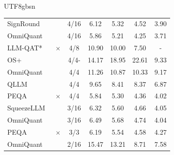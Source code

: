 \documentclass[10pt,journal,compsoc]{IEEEtran}
\newcommand{\<}{\left\langle}
\renewcommand{\>}{\right\rangle}
\newcommand{\1}{\mathbbm{1}}
\begin{document}
\begin{CJK}{UTF8}{gbsn}
\begin{table}[t]
{\begin{tabular}{l  c c |c c c c}
				SignRound~\cite{cheng2023optimize} & \checkmark & 4/16 & 6.12 & 5.32 & 4.52 & 3.90 \\ 
				OmniQuant~\cite{shao2023omniquant} & \checkmark & 4/16  & 5.86 & 5.21 & 4.25 & 3.71 \\
				\midrule
				LLM-QAT*~\cite{liu2023llm} & $\times$ & 4/8  & 10.90 & 10.00 & 7.50 & -\\
				\midrule
				OS+~\cite{wei2023outlier} & \checkmark & 4/4- & 14.17 & 18.95 & 22.61 & 9.33   \\
				OmniQuant~\cite{shao2023omniquant} & \checkmark & 4/4  & 11.26 & 10.87 & 10.33 & 9.17 \\
				QLLM~\cite{liu2023qllm} & \checkmark & 4/4 & 9.65 & 8.41 & 8.37 & 6.87 \\
				PEQA~\cite{kim2023memory} & $\times$ & 4/4 & 5.84 & 5.30 & 4.36 & 4.02  \\
				\midrule
				SqueezeLLM~\cite{kim2023squeezellm} & \checkmark & 3/16 & 6.32 & 5.60 & 4.66 & 4.05 \\
				OmniQuant~\cite{shao2023omniquant} & \checkmark & 3/16 & 6.49 & 5.68 & 4.74 & 4.04 \\
				\midrule
				PEQA~\cite{kim2023memory} & $\times$ & 3/3 & 6.19 & 5.54 & 4.58 & 4.27  \\
				\midrule
				OmniQuant~\cite{shao2023omniquant} & \checkmark & 2/16 & 15.47 & 13.21 & 8.71 & 7.58 \\
				\bottomrule[0.1em]
		\end{tabular}}
		\vspace{-2mm}
	\end{table}





\end{CJK}
\end{document}

